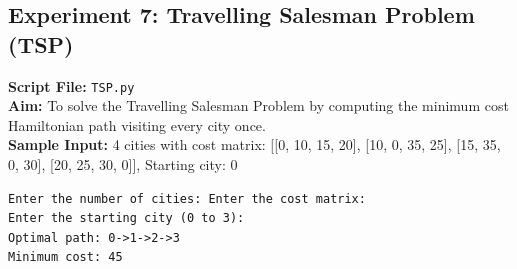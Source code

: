 \subsection*{Experiment 7: Travelling Salesman Problem (TSP)}
\textbf{Script File:} \texttt{TSP.py} \\[4pt]
\textbf{Aim:} To solve the Travelling Salesman Problem by computing the minimum cost Hamiltonian path visiting every city once. \\[4pt]
\textbf{Sample Input:} 4 cities with cost matrix: [[0, 10, 15, 20], [10, 0, 35, 25], [15, 35, 0, 30], [20, 25, 30, 0]], Starting city: 0 \\[6pt]
\begin{tcolorbox}[colback=black!5!white,colframe=black!75!white,title=Terminal Execution Output - Travelling Salesman Problem (TSP)]
\begin{verbatim}
Enter the number of cities: Enter the cost matrix:
Enter the starting city (0 to 3): 
Optimal path: 0->1->2->3
Minimum cost: 45
\end{verbatim}
\end{tcolorbox}

